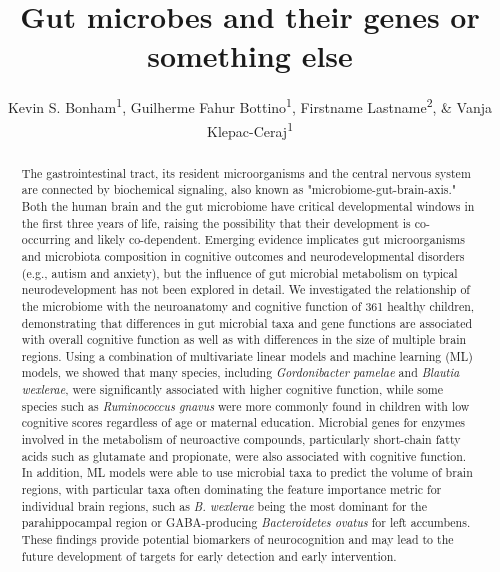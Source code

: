 \documentclass[a4paper]{article}
\title{Gut microbes and their genes or something else}
\author{Kevin S. Bonham\textsuperscript{1}, \space
Guilherme Fahur Bottino\textsuperscript{1}, 
Firstname Lastname\textsuperscript{2}, \&
Vanja Klepac-Ceraj\textsuperscript{1}
}
\begin{document}
\begin{abstract}
    The gastrointestinal tract, its resident microorganisms and the central
    nervous system are connected by biochemical signaling, also known as
    "microbiome-gut-brain-axis." Both the human brain and the gut microbiome
    have critical developmental windows in the first three years of life,
    raising the possibility that their development is co-occurring and
    likely co-dependent. Emerging evidence implicates gut microorganisms and
    microbiota composition in cognitive outcomes and neurodevelopmental
    disorders (e.g., autism and anxiety), but the influence of gut microbial
    metabolism on typical neurodevelopment has not been explored in detail.
    We investigated the relationship of the microbiome with the neuroanatomy
    and cognitive function of 361 healthy children, demonstrating that
    differences in gut microbial taxa and gene functions are associated with
    overall cognitive function as well as with differences in the size of
    multiple brain regions. Using a combination of multivariate linear
    models and machine learning (ML) models, we showed that many species,
    including \emph{Gordonibacter pamelae} and \emph{Blautia wexlerae}, were
    significantly associated with higher cognitive function, while some
    species such as \emph{Ruminococcus gnavus} were more commonly found in
    children with low cognitive scores regardless of age or maternal
    education. Microbial genes for enzymes involved in the metabolism of
    neuroactive compounds, particularly short-chain fatty acids such as
    glutamate and propionate, were also associated with cognitive function.
    In addition, ML models were able to use microbial taxa to predict the
    volume of brain regions, with particular taxa often dominating the
    feature importance metric for individual brain regions, such as \emph{B.
    wexlerae} being the most dominant for the parahippocampal region or
    GABA-producing \emph{Bacteroidetes ovatus} for left accumbens. These
    findings provide potential biomarkers of neurocognition and may lead to
    the future development of targets for early detection and early
    intervention.
\end{abstract}

\end{document}
